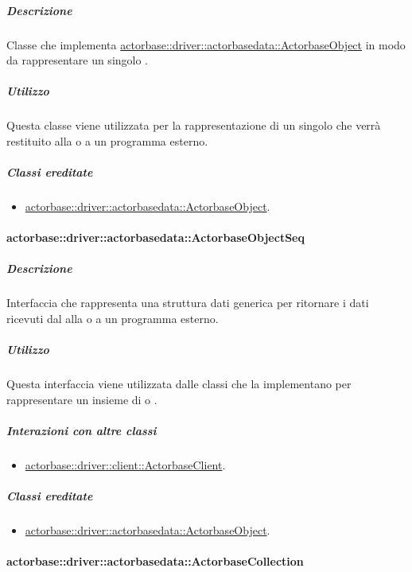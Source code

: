 \documentclass{scalatekids-article}
\begin{document}
\subparagraph{Descrizione}

Classe che implementa \hyperref[sec:actorbase::driver::actorbasedata::ActorbaseObject]{actorbase::driver::actorbasedata::ActorbaseObject}
in modo da rappresentare un singolo .

\subparagraph{Utilizzo}

Questa classe viene utilizzata per la rappresentazione di un singolo
 che verrà restituito alla  o a un programma esterno.

\subparagraph{Classi ereditate}

\begin{itemize}
\item \hyperref[sec:actorbase::driver::actorbasedata::ActorbaseObject]{actorbase::driver::actorbasedata::ActorbaseObject}.
\end{itemize}

\paragraph{actorbase::driver::actorbasedata::ActorbaseObjectSeq}
\label{sec:actorbase::driver::actorbasedata::ActorbaseObjectSeq}

\subparagraph{Descrizione}

Interfaccia che rappresenta una struttura dati generica per ritornare i dati
ricevuti dal  alla  o a un programma esterno.

\subparagraph{Utilizzo}

Questa interfaccia viene utilizzata dalle classi che la implementano per
rappresentare un insieme di  o .

\subparagraph{Interazioni con altre classi}

\begin{itemize}
\item \hyperref[sec:actorbase::driver::client::ActorbaseClient]{actorbase::driver::client::ActorbaseClient}.
\end{itemize}

\subparagraph{Classi ereditate}

\begin{itemize}
\item \hyperref[sec:actorbase::driver::actorbasedata::ActorbaseObject]{actorbase::driver::actorbasedata::ActorbaseObject}.
\end{itemize}

\paragraph{actorbase::driver::actorbasedata::ActorbaseCollection}
\label{sec:actorbase::driver::actorbasedata::ActorbaseCollection}
\end{document}
